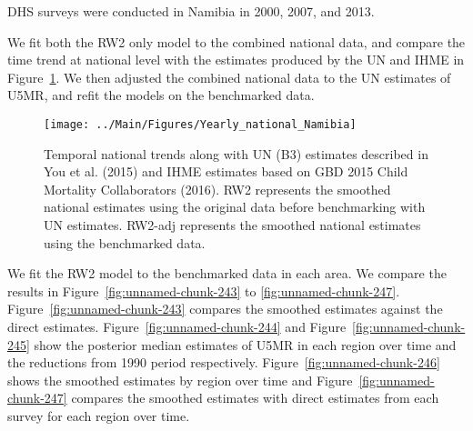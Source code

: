 \documentclass[12pt]{article}\usepackage[]{graphicx}\usepackage[]{color}
\newenvironment{knitrout}{}{} %
\begin{document}


DHS surveys were conducted in Namibia in 2000, 2007, and 2013.

We fit both the RW2 only model to the combined national data, and compare the time trend at national level with the estimates produced by the UN and IHME in Figure~\ref{fig:unnamed-chunk-242}. We then adjusted the combined national data to the UN estimates of U5MR, and refit the models on the benchmarked data. 

\begin{knitrout}
\color{fgcolor}\begin{figure}[bht]

{\centering \texttt{[image: ../Main/Figures/Yearly\_national\_Namibia]} 

}

\caption[Temporal national trends along with UN (B3) estimates described in You et al]{Temporal national trends along with UN (B3) estimates described in You et al. (2015) and IHME estimates based on GBD 2015 Child Mortality Collaborators (2016). RW2 represents the smoothed national estimates using the original data before benchmarking with UN estimates. RW2-adj represents the smoothed national estimates using the benchmarked data.}\label{fig:unnamed-chunk-242}
\end{figure}


\end{knitrout}
 

We fit the RW2 model to the benchmarked data in each area. 
We compare the results in Figure~\ref{fig:unnamed-chunk-243} to \ref{fig:unnamed-chunk-247}.
Figure~\ref{fig:unnamed-chunk-243} compares the smoothed estimates against the direct estimates. Figure~\ref{fig:unnamed-chunk-244} and Figure~\ref{fig:unnamed-chunk-245} show the posterior median estimates of U5MR in each region over time and the reductions from 1990 period respectively.
Figure~\ref{fig:unnamed-chunk-246} shows the smoothed estimates by region over time and Figure~\ref{fig:unnamed-chunk-247} compares the smoothed estimates with direct estimates from each survey for each region over time.


\end{document}
